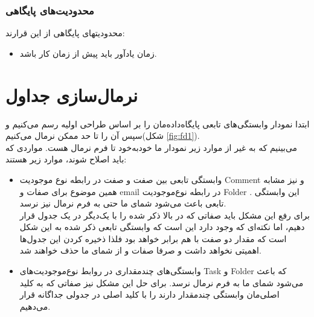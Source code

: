 \documentclass{article}
\begin{document}
\subsubsection*{محدودیت‌های پایگاهی}
محدودیتهای پایگاهی از این قرارند:
\begin{itemize}
\item
زمان یادآور باید پیش از زمان کار باشد. 
\end{itemize}

\section*{نرمال‌سازی جداول}

ابتدا نمودار وابستگی‌های تابعی پایگاه‌داده‌مان را بر اساس طراحی اولیه رسم می‌کنیم و سپس آن را تا حد ممکن نرمال می‌کنیم(شکل \ref{fig:fd1}).
\\
می‌بینیم که به غیر از موارد زیر نمودار ما خود‌به‌خود تا فرم نرمال  هست. مواردی که باید اصلاح شوند، موارد زیر هستند:
\\
\begin{itemize}

\item وابستگی تابعی بین صفت
و صفت
در رابطه نوع موجودیت Comment و نیز مشابه همین موضوع برای صفات
و email در رابطه نوع‌موجودیت Folder . این وابستگی تابعی باعث می‌شود شمای ما حتی به فرم نرمال  نیز نرسد.
\\
برای رفع این مشکل باید صفاتی که در بالا ذکر شده را با یک‌دیگر در یک جدول قرار دهیم، اما نکته‌ای که وجود دارد این است که وابستگی تابعی ذکر شده به این شکل است که مقدار دو صفت با هم برابر خواهد بود فلذا ذخیره کردن این جدول‌ها اهمیتی نخواهد داشت و صرفا صفات
و
از شمای ما حذف خواهند شد.

\item وابستگی‌های چندمقداری در روابط نوع‌موجودیت‌های Task و Folder که باعث می‌شود شمای ما به فرم نرمال  نرسد. برای حل این مشکل نیز صفاتی که به کلید اصلی‌مان وابستگی چندمقدار دارند را با کلید اصلی در جدولی جداگانه قرار می‌دهیم.

\end{itemize}
\end{document}
